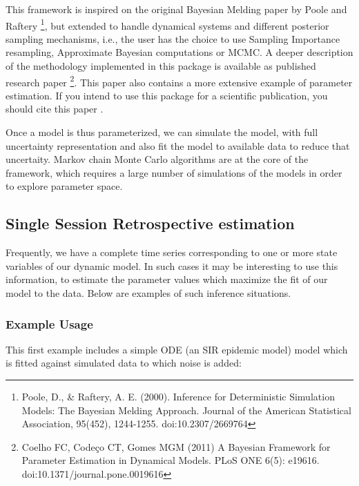 \documentclass[a4paper,10pt,english]{sphinxmanual}
\begin{document}
This framework is inspired on the original Bayesian Melding paper by Poole and Raftery \footnote{
Poole, D., \& Raftery, A. E. (2000). Inference for Deterministic Simulation Models: The Bayesian Melding Approach. Journal of the American Statistical Association, 95(452), 1244-1255. doi:10.2307/2669764
}, but extended to handle dynamical systems and different posterior sampling mechanisms, i.e., the user has the choice to use Sampling Importance resampling, Approximate Bayesian computations or MCMC. A deeper description of the methodology implemented in this package is available as published research paper \footnote{
Coelho FC, Codeço CT, Gomes MGM (2011) A Bayesian Framework for Parameter Estimation in Dynamical Models. PLoS ONE 6(5): e19616. doi:10.1371/journal.pone.0019616
}. This paper also contains a more extensive example of parameter estimation. If you intend to use this package for a scientific publication, you should cite this paper \footnotemark[1].

Once a model is thus parameterized, we can simulate the model, with full uncertainty representation and also fit the model to available data to reduce that uncertaity. Markov chain Monte Carlo algorithms are at the core of the framework, which requires a large number of simulations of the models in order to explore parameter space.


\subsection{Single Session Retrospective estimation}
\label{paramest:single-session-retrospective-estimation}
Frequently, we have a complete time series corresponding to one or more state variables of our dynamic model. In such cases it may be interesting to use this information, to estimate the parameter values which maximize the fit of our model to the data. Below are examples of such inference situations.


\subsubsection{Example Usage}
\label{paramest:example-usage}
This first example includes a simple ODE (an SIR epidemic model) model which is fitted against simulated data to which noise is added:
\end{document}

